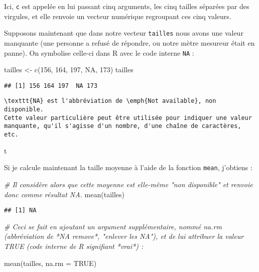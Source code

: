 \documentclass[
]{article}
\newenvironment{Shaded}{\begin{snugshade}}{\end{snugshade}}
\newcommand{\AttributeTok}[1]{\textcolor[rgb]{0.77,0.63,0.00}{#1}}
\newcommand{\CommentTok}[1]{\textcolor[rgb]{0.56,0.35,0.01}{\textit{#1}}}
\newcommand{\ConstantTok}[1]{\textcolor[rgb]{0.00,0.00,0.00}{#1}}
\newcommand{\DecValTok}[1]{\textcolor[rgb]{0.00,0.00,0.81}{#1}}
\newcommand{\FunctionTok}[1]{\textcolor[rgb]{0.00,0.00,0.00}{#1}}
\newcommand{\NormalTok}[1]{#1}
\newcommand{\OtherTok}[1]{\textcolor[rgb]{0.56,0.35,0.01}{#1}}
\begin{document}
Ici, \texttt{c} est appelée en lui passant cinq arguments, les cinq
tailles séparées par des virgules, et elle renvoie un vecteur numérique
regroupant ces cinq valeurs.

Supposons maintenant que dans notre vecteur \texttt{tailles} nous avons
une valeur manquante (une personne a refusé de répondre, ou notre mètre
mesureur était en panne). On symbolise celle-ci dans R avec le code
interne \texttt{NA} :

\begin{Shaded}
\begin{Highlighting}[]
\NormalTok{tailles }\OtherTok{\textless{}{-}} \FunctionTok{c}\NormalTok{(}\DecValTok{156}\NormalTok{, }\DecValTok{164}\NormalTok{, }\DecValTok{197}\NormalTok{, }\ConstantTok{NA}\NormalTok{, }\DecValTok{173}\NormalTok{)}
\NormalTok{tailles}
\end{Highlighting}
\end{Shaded}

\begin{verbatim}
## [1] 156 164 197  NA 173
\end{verbatim}

\begin{verbatim}
\texttt{NA} est l'abbréviation de \emph{Not available}, non disponible.
Cette valeur particulière peut être utilisée pour indiquer une valeur
manquante, qu'il s'agisse d'un nombre, d'une chaîne de caractères, etc.

\end{verbatim}

\begin{infobox}
t
\end{infobox}

Si je calcule maintenant la taille moyenne à l'aide de la fonction
\texttt{mean}, j'obtiens :

\begin{Shaded}
\begin{Highlighting}[]
\CommentTok{\# Il considère alors que cette moyenne est elle{-}même "non disponible" et renvoie donc comme résultat \textasciigrave{}NA\textasciigrave{}.}
\FunctionTok{mean}\NormalTok{(tailles)}
\end{Highlighting}
\end{Shaded}

\begin{verbatim}
## [1] NA
\end{verbatim}

\begin{Shaded}
\begin{Highlighting}[]
\CommentTok{\# Ceci se fait en ajoutant un argument supplémentaire, nommé \textasciigrave{}na.rm\textasciigrave{} (abbréviation de *NA remove*, "enlever les NA"), et de lui attribuer la valeur \textasciigrave{}TRUE\textasciigrave{} (code interne de R signifiant *vrai*) :}

\FunctionTok{mean}\NormalTok{(tailles, }\AttributeTok{na.rm =} \ConstantTok{TRUE}\NormalTok{)}
\end{Highlighting}
\end{Shaded}
\end{document}
